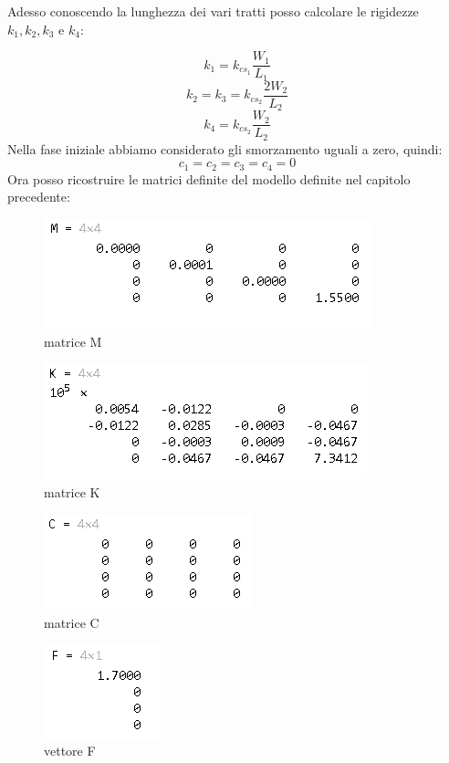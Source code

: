 \documentclass{article}
\begin{document}
Adesso conoscendo la lunghezza dei vari tratti posso calcolare le rigidezze $k_{1},k_{2},k_{3}$ e $k_{4}$:

\begin{equation*}
k_{1} = k_{cs_1}\frac{W_1}{L_1}
\end{equation*}
\begin{equation*}
k_{2} = k_{3} = k_{cs_2}\frac{2W_2}{L_2}
\end{equation*}
\begin{equation*}
k_{4} = k_{cs_2}\frac{W_2}{L_2}
\end{equation*}
Nella fase iniziale abbiamo considerato gli smorzamento uguali a zero, quindi:
\begin{equation*}
c_{1} = c_{2} = c_{3} = c_{4} = 0
\end{equation*}
Ora posso ricostruire le matrici definite del modello definite nel capitolo precedente:
\begin{figure}[H]
\centering
\includegraphics[width=.5\textwidth]{./assex/matrice_m.png}
\caption{matrice M}
\end{figure}
\begin{figure}[H]
\centering
\includegraphics[width=.5\textwidth]{./assex/matrice_k.png}
\caption{matrice K}
\end{figure}
\begin{figure}[H]
\centering
\includegraphics[width=.4\textwidth]{./assex/matrice_c.png}
\caption{matrice C}
\end{figure}
\begin{figure}[H]
\centering
\includegraphics[width=.2\textwidth]{./assex/matrice_f.png}
\caption{vettore F}
\end{figure}
\end{document}
